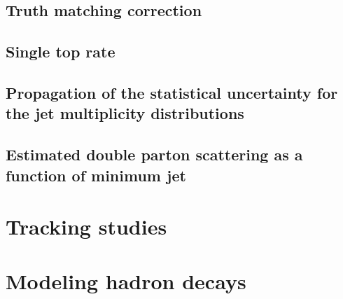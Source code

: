 \documentclass[12pt]{ucbthesis}
\begin{document}
\section{Truth matching correction}
\label{app:tcorr}
%

\section{Single top rate}
\label{app:unfoldwt}
%
\section{Propagation of the statistical uncertainty for the jet multiplicity distributions}
\label{app:stats}
%

\section{Estimated double parton scattering as a function of minimum jet \pt}
\label{app:dps}
%

\chapter{Tracking studies}
\label{app:track}
\chapter{Modeling hadron decays}
\label{app:evtgen}

\backmatter


\end{document}
